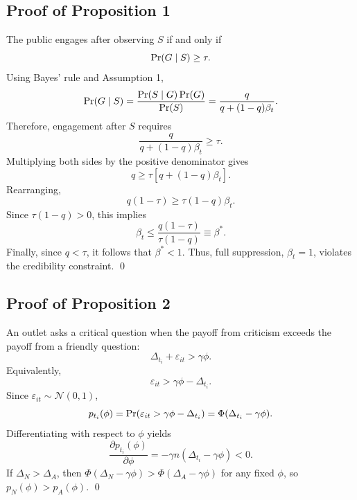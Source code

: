 \subsection{Proof of Proposition 1}

The public engages after observing $S$ if and only if
\begin{equation}
    \Pr(G\mid S)\geq \tau.
\end{equation}
Using Bayes' rule and Assumption 1,
\begin{equation}
    \Pr(G\mid S)=\frac{\Pr(S\mid G)\Pr(G)}{\Pr(S)}
    =\frac{q}{q+(1-q)\beta_t}.
\end{equation}
Therefore, engagement after $S$ requires
\begin{equation}
    \frac{q}{q+(1-q)\beta_t}\geq \tau.
\end{equation}
Multiplying both sides by the positive denominator gives
\begin{equation}
    q \geq \tau[q+(1-q)\beta_t].
\end{equation}
Rearranging,
\begin{equation}
    q(1-\tau) \geq \tau(1-q)\beta_t.
\end{equation}
Since $\tau(1-q)>0$, this implies
\begin{equation}
    \beta_t \leq \frac{q(1-\tau)}{\tau(1-q)}\equiv \beta^*.
\end{equation}
Finally, since $q<\tau$, it follows that $\beta^*<1$. Thus, full suppression, $\beta_t=1$, violates the credibility constraint. \qed

\subsection{Proof of Proposition 2}

An outlet asks a critical question when the payoff from criticism exceeds the payoff from a friendly question:
\begin{equation}
    \Delta_{t_i}+\varepsilon_{it} > \gamma\phi.
\end{equation}
Equivalently,
\begin{equation}
    \varepsilon_{it}>\gamma\phi-\Delta_{t_i}.
\end{equation}
Since $\varepsilon_{it}\sim\mathcal{N}(0,1)$,
\begin{equation}
    p_{t_i}(\phi)=\Pr(\varepsilon_{it}>\gamma\phi-\Delta_{t_i})
    =\Phi(\Delta_{t_i}-\gamma\phi).
\end{equation}
Differentiating with respect to $\phi$ yields
\begin{equation}
    \frac{\partial p_{t_i}(\phi)}{\partial \phi}=-\gamma n(\Delta_{t_i}-\gamma\phi)<0.
\end{equation}
If $\Delta_N>\Delta_A$, then $\Phi(\Delta_N-\gamma\phi)>\Phi(\Delta_A-\gamma\phi)$ for any fixed $\phi$, so $p_N(\phi)>p_A(\phi)$. \qed

